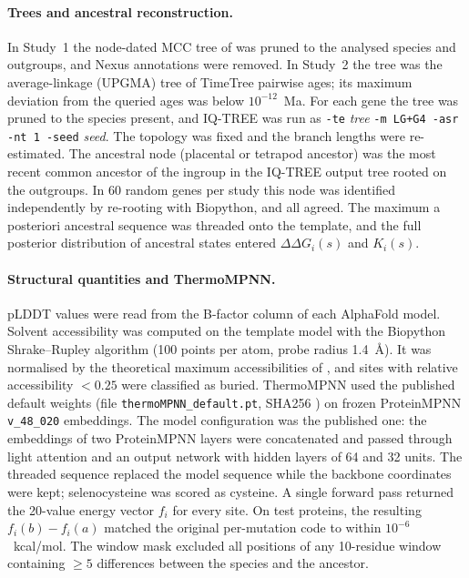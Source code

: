 \documentclass[11pt]{article}
\begin{document}
\paragraph{Trees and ancestral reconstruction.} In Study~1 the node-dated MCC tree of \citet{Upham2019} was pruned to the analysed species and outgroups, and Nexus annotations were removed. In Study~2 the tree was the average-linkage (UPGMA) tree of TimeTree pairwise ages; its maximum deviation from the queried ages was below $10^{-12}$~Ma. For each gene the tree was pruned to the species present, and IQ-TREE was run as \texttt{-te} \emph{tree} \texttt{-m LG+G4 -asr -nt 1 -seed} \emph{seed}. The topology was fixed and the branch lengths were re-estimated. The ancestral node (placental or tetrapod ancestor) was the most recent common ancestor of the ingroup in the IQ-TREE output tree rooted on the outgroups. In 60 random genes per study this node was identified independently by re-rooting with Biopython, and all agreed. The maximum a posteriori ancestral sequence was threaded onto the template, and the full posterior distribution of ancestral states entered $\Delta\Delta G_i(s)$ and $K_i(s)$.

\paragraph{Structural quantities and ThermoMPNN.} pLDDT values were read from the B-factor column of each AlphaFold model. Solvent accessibility was computed on the template model with the Biopython Shrake--Rupley algorithm \citep{Shrake1973} (100 points per atom, probe radius 1.4~\AA). It was normalised by the theoretical maximum accessibilities of \citet{Tien2013}, and sites with relative accessibility $<0.25$ were classified as buried. ThermoMPNN used the published default weights (file \texttt{thermoMPNN\_default.pt}, SHA256 \ThermoSHA) on frozen ProteinMPNN \texttt{v\_48\_020} embeddings. The model configuration was the published one: the embeddings of two ProteinMPNN layers were concatenated and passed through light attention and an output network with hidden layers of 64 and 32 units. The threaded sequence replaced the model sequence while the backbone coordinates were kept; selenocysteine was scored as cysteine. A single forward pass returned the 20-value energy vector $f_i$ for every site. On test proteins, the resulting $f_i(b)-f_i(a)$ matched the original per-mutation code to within $10^{-6}$~kcal/mol. The window mask excluded all positions of any 10-residue window containing $\geq 5$ differences between the species and the ancestor.
\end{document}
